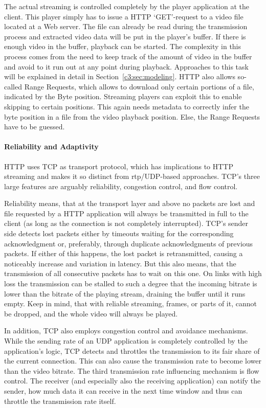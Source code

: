 The actual streaming is controlled completely by the player application at the client. This player simply has to issue a \gls{HTTP} `GET'-request to a video file located at a Web server. The file can already be read during the transmission process and extracted video data will be put in the player's buffer. If there is enough video in the buffer, playback can be started. The complexity in this process comes from the need to keep track of the amount of video in the buffer and avoid to it run out at any point during playback. Approaches to this task will be explained in detail in Section~\ref{c3:sec:modeling}. \gls{HTTP} also allows so-called Range Requests, which allows to download only certain portions of a file, indicated by the Byte position. Streaming players can exploit this to enable skipping to certain positions. This again needs metadata to correctly infer the byte position in a file from the video playback position. Else, the Range Requests have to be guessed. 

\paragraph{Reliability and Adaptivity}

\gls{HTTP} uses \gls{TCP} as transport protocol, which has implications to \gls{HTTP} streaming and makes it so distinct from \gls{rtp}/\gls{UDP}-based approaches. \gls{TCP}'s three large features are arguably reliability, congestion control, and flow control.

Reliability means, that at the transport layer and above no packets are lost and file requested by a \gls{HTTP} application will always be transmitted in full to the client (as long as the connection is not completely interrupted). \gls{TCP}'s sender side detects lost packets either by timeouts waiting for the corresponding acknowledgment or, preferably, through duplicate acknowledgments of previous packets. If either of this happens, the lost packet is retransmitted, causing a noticeably increase and variation in latency. But this also means, that the transmission of all consecutive packets has to wait on this one. On links with high loss the transmission can be stalled to such a degree that the incoming bitrate is lower than the bitrate of the playing stream, draining the buffer until it runs empty. Keep in mind, that with reliable streaming, frames, or parts of it, cannot be dropped, and the whole video will always be played.

In addition, \gls{TCP} also employs congestion control and avoidance mechanisms. While the sending rate of an \gls{UDP} application is completely controlled by the application's logic, \gls{TCP} detects and throttles the transmission to its fair share of the current connection. This can also cause the transmission rate to become lower than the video bitrate. The third transmission rate influencing mechanism is flow control. The receiver (and especially also the receiving application) can notify the sender, how much data it can receive in the next time window and thus can throttle the transmission rate itself.

